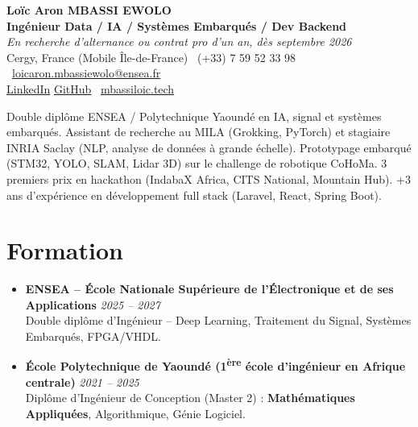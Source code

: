 \documentclass[a4paper,11pt]{article}
\begin{document}
\begin{center}
    {\Large \textbf{Loïc Aron MBASSI EWOLO}} \\ \vspace{4pt}
    \textbf{\large Ingénieur Data / IA / Systèmes Embarqués / Dev Backend} \\
    \textit{\small En recherche d'alternance ou contrat pro d'un an, dès septembre 2026} \\ \vspace{4pt}
    \small
    Cergy, France (Mobile \^Ile-de-France) \quad
    \Telefon\ (+33) 7 59 52 33 98 \quad
    {\color{primary}\Letter\ \href{mailto:loicaron.mbassiewolo@ensea.fr}{loicaron.mbassiewolo@ensea.fr}} \\ \vspace{2pt}
    {\color{primary}\href{https://www.linkedin.com/in/loic-mbassi/}{LinkedIn}} \quad
    {\color{primary}\href{https://github.com/Nameless0l}{GitHub}} \quad
    {\color{primary}\Mundus\ \href{https://mbassiloic.tech}{mbassiloic.tech}}
\end{center}

\vspace{-6pt}

\noindent\small{Double diplôme ENSEA / Polytechnique Yaoundé en IA, signal et systèmes embarqués. Assistant de recherche au MILA (Grokking, PyTorch) et stagiaire INRIA Saclay (NLP, analyse de données à grande échelle). Prototypage embarqué (STM32, YOLO, SLAM, Lidar 3D) sur le challenge de robotique CoHoMa. 3 premiers prix en hackathon (IndabaX Africa, CITS National, Mountain Hub). +3 ans d'expérience en développement full stack (Laravel, React, Spring Boot).}

\section{Formation}
\begin{itemize}[leftmargin=*, label=\tiny$\bullet$, nosep]
    \item \textbf{ENSEA -- École Nationale Supérieure de l'Électronique et de ses Applications} \hfill \textit{2025 -- 2027} \\
    \small{Double diplôme d'Ingénieur -- Deep Learning, Traitement du Signal, Systèmes Embarqués, FPGA/VHDL.}
    \vspace{0.3cm}
    \item \textbf{École Polytechnique de Yaoundé (1\textsuperscript{ère} école d'ingénieur en Afrique centrale)} \hfill \textit{2021 -- 2025} \\
    \small{Diplôme d'Ingénieur de Conception (Master 2) : \textbf{Mathématiques Appliquées}, Algorithmique, Génie Logiciel.}
\end{itemize}
\end{document}
